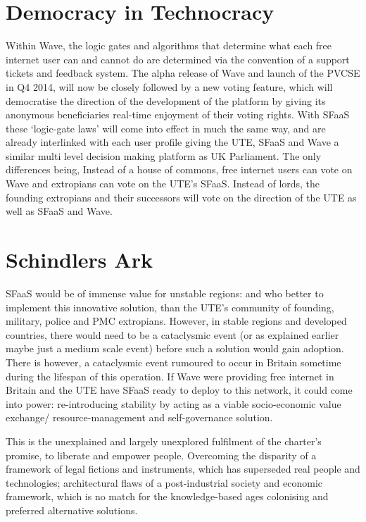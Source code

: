 \documentclass[letterpaper,10pt,openany,oneside,english]{sphinxmanual}
\begin{document}
\chapter{Democracy in Technocracy}
\label{\detokenize{democracy-technocracy:democracy-in-technocracy}}\label{\detokenize{democracy-technocracy::doc}}
Within Wave, the logic gates and algorithms that determine what each free internet user can and cannot do are determined via the convention of a support tickets and feedback system. The alpha release of Wave and launch of the PVCSE in Q4 2014, will now be closely followed by a new voting feature, which will democratise the direction of the development of the platform by giving its anonymous beneficiaries real-time enjoyment of their voting rights. With SFaaS these ‘logic-gate laws’ will come into effect in much the same way, and are already interlinked with each user profile giving the UTE, SFaaS and Wave a similar multi level decision making platform as UK Parliament. The only differences being, Instead of a house of commons, free internet users can vote on Wave and extropians can vote on the UTE’s SFaaS. Instead of lords, the founding extropians and their successors will vote on the direction of the UTE as well as SFaaS and Wave.


\chapter{Schindlers Ark}
\label{\detokenize{schindlers-ark:schindlers-ark}}\label{\detokenize{schindlers-ark::doc}}
SFaaS would be of immense value for unstable regions: and who better to implement this innovative solution, than the UTE’s community of founding, military, police and PMC extropians. However, in stable regions and developed countries, there would need to be a cataclysmic event (or as explained earlier maybe just a medium scale event) before such a solution would gain adoption. There is however, a cataclysmic event rumoured to occur in Britain sometime during the lifespan of this operation. If Wave were providing free internet in Britain and the UTE have SFaaS ready to deploy to this network, it could come into power: re-introducing stability by acting as a viable socio-economic value exchange/ resource-management and self-governance solution.

This is the unexplained and largely unexplored fulfilment of the charter’s promise, to liberate and empower people. Overcoming the disparity of a framework of legal fictions and instruments, which has superseded real people and technologies; architectural flaws of a post-industrial society and economic framework, which is no match for the knowledge-based ages colonising and preferred alternative solutions.
\end{document}
